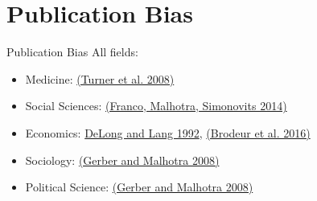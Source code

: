 \documentclass{beamer}
\begin{document}
\section{Publication Bias}


\begin{frame}{Publication Bias}
All fields:
\begin{itemize}[<.->]
\item Medicine: \href{http://www.nejm.org/doi/full/10.1056/nejmsa065779}{(Turner et al. 2008)}
\item Social Sciences: \href{http://science.sciencemag.org/content/345/6203/1502.short}{(Franco, Malhotra, Simonovits 2014)}
\item Economics: \href{www.jstor.org/stable/2138833}{DeLong and Lang 1992}, \href{https://www.aeaweb.org/articles.php?doi=10.1257/app.20150044}{(Brodeur et al. 2016)}
\item Sociology: \href{http://smr.sagepub.com/content/37/1/3.short}{(Gerber and Malhotra 2008)}
\item Political Science: \href{http://nowpublishers.com/article/Details/QJPS-8024}{(Gerber and Malhotra 2008)}
\end{itemize}
\end{frame}
\end{document}
